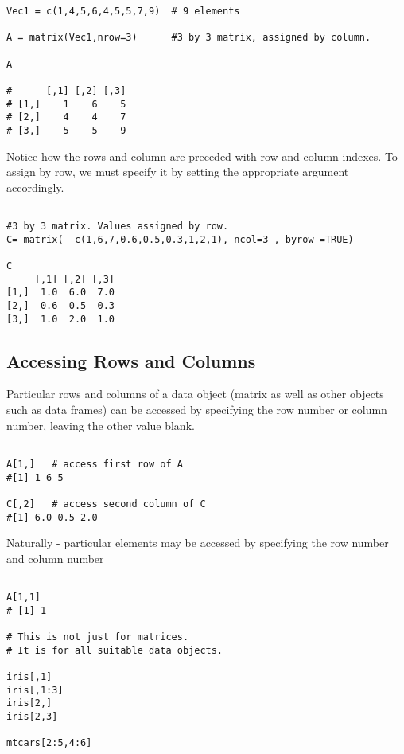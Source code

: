 \documentclass[a4paper,12pt]{article}
\begin{document}
\begin{verbatim}
Vec1 = c(1,4,5,6,4,5,5,7,9)  # 9 elements

A = matrix(Vec1,nrow=3)      #3 by 3 matrix, assigned by column.

A

#      [,1] [,2] [,3]
# [1,]    1    6    5
# [2,]    4    4    7
# [3,]    5    5    9
\end{verbatim}


Notice how the rows and column are preceded with row and column indexes. To assign by row, we must specify it by setting the appropriate argument accordingly.

\begin{framed}
\begin{verbatim}

#3 by 3 matrix. Values assigned by row.
C= matrix(  c(1,6,7,0.6,0.5,0.3,1,2,1), ncol=3 , byrow =TRUE)

C
     [,1] [,2] [,3]
[1,]  1.0  6.0  7.0
[2,]  0.6  0.5  0.3
[3,]  1.0  2.0  1.0
\end{verbatim}
\end{framed}

\subsection{Accessing Rows and Columns}
Particular rows and columns of a data object (matrix as well as other objects such as data frames) can be accessed by specifying the row number or column number, leaving the other value blank.
\begin{framed}
\begin{verbatim}

A[1,]   # access first row of A
#[1] 1 6 5

C[,2]   # access second column of C
#[1] 6.0 0.5 2.0
\end{verbatim}
\end{framed}


Naturally - particular elements may be accessed by specifying the row number and column number


\begin{verbatim}

A[1,1]
# [1] 1

# This is not just for matrices.
# It is for all suitable data objects.

iris[,1]
iris[,1:3]
iris[2,]
iris[2,3]

mtcars[2:5,4:6]
\end{verbatim}
\end{document}
